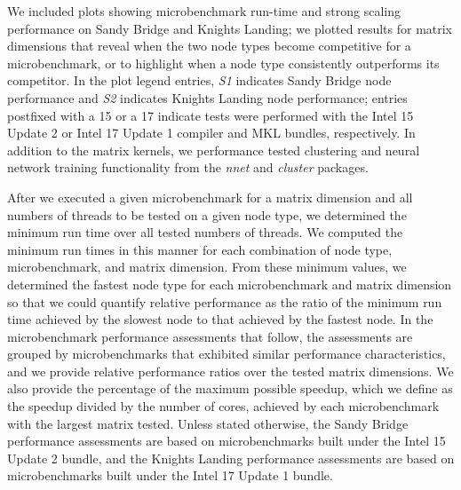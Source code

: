 We included plots showing microbenchmark run-time and strong scaling performance
  on Sandy Bridge and Knights Landing; we plotted results for
  matrix dimensions that reveal when the two node types become competitive for
  a microbenchmark, or to highlight when a node type consistently outperforms
  its competitor.
In the plot legend entries, \textit{S1} indicates Sandy Bridge node performance
  and \textit{S2} indicates Knights Landing node performance; entries postfixed
  with a 15 or a 17 indicate tests were performed with the Intel 15 Update 2 or
  Intel 17 Update 1 compiler and MKL bundles, respectively.
In addition to the matrix kernels, we performance tested clustering and
  neural network training functionality from the \textit{nnet} and
  \textit{cluster} packages.

After we executed a given microbenchmark for a matrix dimension and all numbers
  of threads to be tested on a given node type, we determined the minimum run
  time over all tested numbers of threads.
We computed the minimum run times in this manner for each combination of node
  type, microbenchmark, and matrix dimension.
From these minimum values, we determined the fastest node type for each
  microbenchmark and matrix dimension so that we could quantify relative
  performance as the ratio of the minimum run time achieved by the slowest node
  to that achieved by the fastest node.
In the microbenchmark performance assessments that follow, the assessments are
  grouped by microbenchmarks that exhibited similar performance characteristics,
  and we provide relative performance ratios over the tested matrix dimensions.
We also provide the percentage of the maximum possible speedup, which we define
  as the speedup divided by the number of cores, achieved by each microbenchmark
  with the largest matrix tested.
Unless stated otherwise, the Sandy Bridge performance assessments are based on
  microbenchmarks built under the Intel 15 Update 2 bundle, and the Knights
  Landing performance assessments are based on microbenchmarks built under the
  Intel 17 Update 1 bundle.


